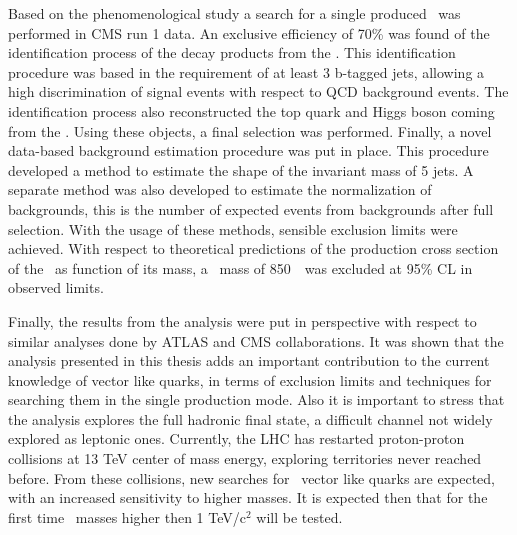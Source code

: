 Based on the phenomenological study a search for a single produced \Tp~was performed in CMS run 1 data. An exclusive efficiency of 70\% was found of the identification process of the decay products from the \Tp. This identification procedure was based in the requirement of at least 3 b-tagged jets, allowing a high discrimination of signal events with respect to QCD background events. The identification process also reconstructed the top quark and Higgs boson coming from the \Tp. Using these objects, a final selection was performed. Finally, a novel data-based background estimation procedure was put in place. This procedure developed a method to estimate the shape of the invariant mass of 5 jets. A separate method was also developed to estimate the normalization of backgrounds, this is the number of expected events from backgrounds after full selection. With the usage of these methods, sensible exclusion limits were achieved. With respect to theoretical predictions of the production cross section of the \Tp~as function of its mass, a \Tp~mass of 850~\GeVcc~was excluded at 95\% CL in observed limits.

Finally, the results from the analysis were put in perspective with respect to similar analyses done by ATLAS and CMS collaborations. It was shown that the analysis presented in this thesis adds an important contribution to the current knowledge of vector like quarks, in terms of exclusion limits and techniques for searching them in the single production mode. Also it is important to stress that the analysis explores the full hadronic final state, a difficult channel not widely explored as leptonic ones. Currently, the LHC has restarted proton-proton collisions at 13 TeV center of mass energy, exploring territories never reached before. From these collisions, new searches for \Tp~vector like quarks are expected, with an increased sensitivity to higher masses. It is expected then that for the first time \Tp~masses higher then 1 TeV/$\text{c}^{2}$ will be tested.
